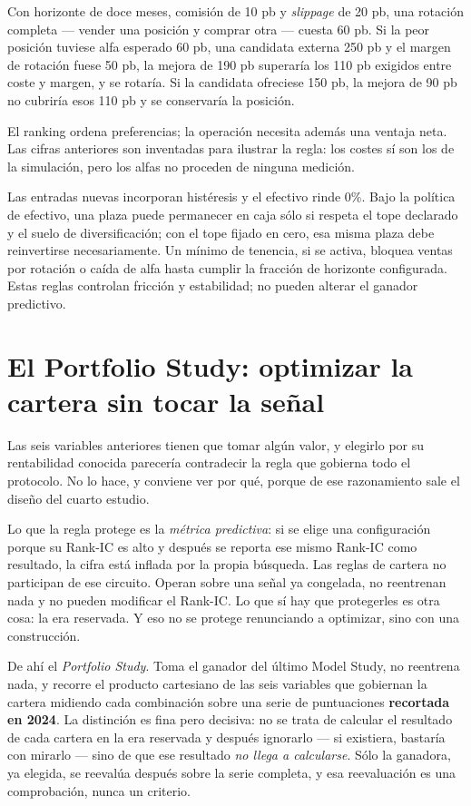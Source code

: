 \begin{ejemplo}
Con horizonte de doce meses, comisión de 10 pb y \textit{slippage} de 20 pb, una rotación completa
--- vender una posición y comprar otra --- cuesta 60 pb. Si la peor posición tuviese alfa esperado
60 pb, una candidata externa 250 pb y el margen de rotación fuese 50 pb, la mejora de 190 pb
superaría los 110 pb exigidos entre coste y margen, y se rotaría. Si la candidata ofreciese 150 pb,
la mejora de 90 pb no cubriría esos 110 pb y se conservaría la posición.
\end{ejemplo}

El ranking ordena preferencias; la operación necesita además una ventaja neta. Las cifras anteriores
son inventadas para ilustrar la regla: los costes sí son los de la simulación, pero los alfas no
proceden de ninguna medición.

Las entradas nuevas incorporan histéresis y el efectivo rinde 0\%. Bajo la política de efectivo, una
plaza puede permanecer en caja sólo si respeta el tope declarado
y el suelo de diversificación; con el tope fijado en cero, esa misma plaza debe reinvertirse
necesariamente. Un mínimo de tenencia, si se activa, bloquea ventas por rotación o caída de alfa
hasta cumplir la fracción de horizonte configurada. Estas reglas controlan fricción y estabilidad;
no pueden alterar el ganador predictivo.

\section{El Portfolio Study: optimizar la cartera sin tocar la señal}
\label{sec:portfolio-study}

Las seis variables anteriores tienen que tomar algún valor, y elegirlo por su rentabilidad conocida
parecería contradecir la regla que gobierna todo el protocolo. No lo hace, y conviene ver por qué,
porque de ese razonamiento sale el diseño del cuarto estudio.

Lo que la regla protege es la \emph{métrica predictiva}: si se elige una configuración porque su
Rank-IC es alto y después se reporta ese mismo Rank-IC como resultado, la cifra está inflada por la
propia búsqueda. Las reglas de cartera no participan de ese circuito. Operan sobre una señal ya
congelada, no reentrenan nada y no pueden modificar el Rank-IC. Lo que sí hay que protegerles es
otra cosa: la era reservada. Y eso no se protege renunciando a optimizar, sino con una
construcción.

De ahí el \emph{Portfolio Study}. Toma el ganador del último Model Study, no reentrena nada, y
recorre el producto cartesiano de las seis variables que gobiernan la cartera midiendo cada
combinación sobre una serie de puntuaciones \textbf{recortada en 2024}. La distinción es fina pero
decisiva: no se trata de calcular el resultado de cada cartera en la era reservada y después
ignorarlo --- si existiera, bastaría con mirarlo --- sino de que ese resultado \emph{no llega a
calcularse}. Sólo la ganadora, ya elegida, se reevalúa después sobre la serie completa, y esa
reevaluación es una comprobación, nunca un criterio.

